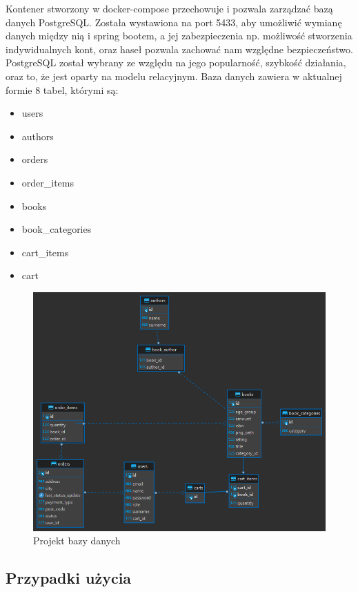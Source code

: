 \documentclass[]{article}
\begin{document}
  Kontener stworzony w docker-compose przechowuje i pozwala zarządzać bazą danych PostgreSQL. Została wystawiona na port 5433, aby umożliwić wymianę danych między nią i spring bootem, a jej zabezpieczenia np. możliwość stworzenia indywidualnych kont, oraz haseł pozwala zachować nam względne bezpieczeństwo. PostgreSQL został wybrany ze względu na jego popularność, szybkość działania, oraz to, że jest oparty na modelu relacyjnym.
Baza danych zawiera w aktualnej formie 8 tabel, którymi są:
\begin{itemize}
	\item users
	\item authors
	\item orders
	\item order\_items
	\item books
	\item book\_categories
	\item cart\_items
	\item cart
\end{itemize}
\begin{figure}[h]
	\centering
	\includegraphics[scale=0.45]{../../postgres.png}
	\caption{Projekt bazy danych}
\end{figure}
\newpage

\subsection{Przypadki użycia}
\end{document}
